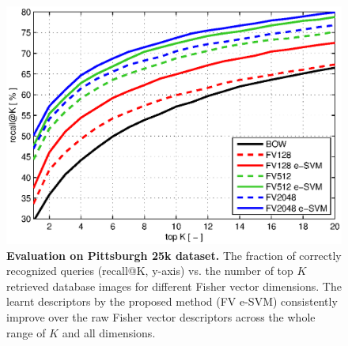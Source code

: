 \documentclass[table]{article} %
\begin{document}
    \begin{figure}[t!]
        \centering
        \includegraphics[width=\linewidth]{imgs/plotPitt25k}    
        \caption{
            \textbf{Evaluation on Pittsburgh 25k \cite{Gronat13} dataset.} The fraction of correctly recognized queries (recall@K, y-axis) vs. the number of top $K$ retrieved database images for different Fisher vector dimensions. The learnt descriptors by the proposed method (FV e-SVM) consistently improve over the raw Fisher vector descriptors across the whole range of $K$  and all dimensions.
        }
        \label{fig:recall}
    \end{figure}

\end{document}
